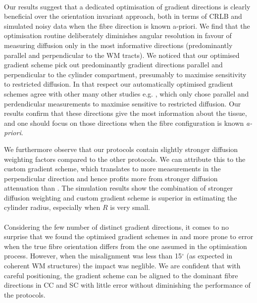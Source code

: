 \paragraph{}
Our results suggest that a dedicated optimisation of gradient directions is clearly beneficial over the orientation invariant \OI{} approach, both in terms of CRLB and simulated noisy data when the fibre direction is known a-priori. We find that the optimisation routine deliberately diminishes angular resolution in favour of measuring diffusion only in the most informative directions (predominantly parallel and perpendicular to the WM tracts). We noticed that our optimised gradient scheme pick out predominantly gradient directions parallel and perpendicular to the cylinder compartment, presumably to maximise sensitivity to restricted diffusion. In that respect our automatically optimised gradient schemes agree with other many other studies e.g. \citep{Stanisz:1997,Avram:2008,Assaf:2008,Panagiotaki:2012}, which only chose parallel and perdendicular measurements to maximise sensitive to restricted diffusion. Our results confirm that these directions give the most information about the tissue, and one should focus on those directions when the fibre configuration is known \textit{a-priori}. 


We furthermore observe that our {\FD} protocols contain slightly stronger diffusion weighting factors compared to the other protocols. We can attribute this to the custom gradient scheme, which translates to more measurements in the perpendicular direction and hence profits more from stronger diffusion attenuation than {\OI}. The simulation results show the combination of stronger diffusion weighting and custom gradient scheme is superior in estimating the cylinder radius, especially when $R$ is very small.

\paragraph{}
Considering the few number of distinct gradient directions, it comes to no surprise that we found the optimised gradient schemes in {\FD} and {\DO} more prone to error when the true fibre orientation differs from the one assumed in the optimisation process. However, when the misalignment was less than 15$^\circ$ (as expected in coherent WM structures) the impact was neglible. We are confident that with careful positioning, the {\SF} gradient scheme can be aligned to the dominant fibre directions in CC and SC with little error without diminishing the performance of the {\SF} protocols.
